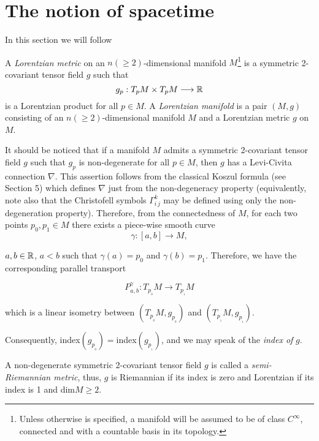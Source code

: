 \chapter{The notion of spacetime}

In this section we will follow \cite{romero10}


A \emph{Lorentzian metric} on an $n(\geq 2)$-dimensional manifold $M$\footnote{Unless otherwise is specified, a manifold will be assumed to be of class $C^{\infty}$, connected and with a countable basis in its topology.} is a symmetric 2-covariant tensor field $g$ such that $$g_p : T_pM\times T_pM \longrightarrow \mathbb{R}$$ is a Lorentzian product for all $p\in M$. A \emph{Lorentzian manifold} is a pair $(M,g)$ consisting of an $n(\geq 2)$-dimensional manifold $M$ and a Lorentzian metric $g$ on $M$.


\vspace{2mm}


It should be noticed that if a manifold $M$ admits a symmetric 2-covariant tensor field $g$ such that $g_p$ is non-degenerate for all $p\in M$, then $g$ has a Levi-Civita connection $\nabla$. This assertion follows from the classical Koszul formula (see Section 5) which defines $\nabla$ just from the non-degeneracy property (equivalently, note also that the Christofell symbols $\Gamma_{i\,j}^k$ may be defined using only the non-degeneration property). Therefore, from the connectedness of $M$, for each two points $p_0,p_1\in M$ there exists a piece-wise smooth curve
\[
\gamma : [a,b] \longrightarrow M,
\]

$a,b\in \mathbb{R}$, $a<b$ such that $\gamma(a)=p_0$ and $\gamma(b)=p_1$. Therefore, we have the corresponding parallel transport

\[
P_{a,b}^{\gamma} : T_{p_{_0}}M \longrightarrow T_{p_{_1}}M
\]

which is a linear isometry between $(T_{p_{_0}}M,g_{p_{_0}})$ and  $(T_{p_{_1}}M,g_{p_{_1}})$.

Consequently, index$(g_{p_{_0}})=$index$(g_{p_{_1}})$, and we may speak of the \emph{index of} $g$.

A non-degenerate symmetric 2-covariant tensor field $g$ is called a \emph{semi-Riemannian metric}, thus, $g$ is Riemannian if its index is zero and Lorentzian if its index is 1 and dim$M\geq 2$.

